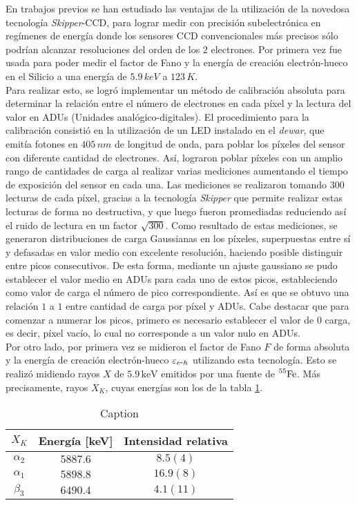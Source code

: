 \noindent En trabajos previos\cite{Rodrigues} se han estudiado las ventajas de la utilización de la novedosa tecnología \textit{Skipper}-CCD, para lograr medir con precisión subelectrónica en regímenes de energía donde los sensores CCD convencionales más precisos sólo podrían alcanzar resoluciones del orden de los $2$ electrones. Por primera vez fue usada para poder medir el factor de Fano y la energía de creación electrón-hueco en el Silicio a una energía de $5.9\,\si{keV}$ a $123\,\si{K}$.\\
\indent Para realizar esto, se logró implementar un método de calibración absoluta para determinar la relación entre el número de electrones en cada píxel y la lectura del valor en ADUs (Unidades analógico-digitales). El procedimiento para la calibración consistió en la utilización de un LED instalado en el \textit{dewar}, que emitía fotones en $405\,\si{nm}$ de longitud de onda, para poblar los píxeles del sensor con diferente cantidad de electrones. Así, lograron poblar píxeles con un amplio rango de cantidades de carga al realizar varias mediciones aumentando el tiempo de exposición del sensor en cada una. Las mediciones se realizaron tomando $300$ lecturas de cada píxel, gracias a la tecnología \textit{Skipper} que permite realizar estas lecturas de forma no destructiva, y que luego fueron promediadas reduciendo así el ruido de lectura en un factor $\sqrt{300}$. Como resultado de estas mediciones, se generaron distribuciones de carga Gaussianas en los píxeles, superpuestas entre sí y defasadas en valor medio con excelente resolución, haciendo posible distinguir entre picos consecutivos. De esta forma, mediante un ajuste gaussiano se pudo establecer el valor medio en ADUs para cada uno de estos picos, estableciendo como valor de carga el número de pico correspondiente. Así es que se obtuvo una relación $1$ a $1$ entre cantidad de carga por píxel y ADUs. Cabe destacar que para comenzar a numerar los picos, primero es necesario establecer el valor de $0$ carga, es decir, píxel vacío, lo cual no corresponde a un valor nulo en ADUs. \\
\indent Por otro lado, por primera vez se midieron el factor de Fano $F$ de forma absoluta y la energía de creación electrón-hueco $\varepsilon_{e\mbox{-}h}$ utilizando esta tecnología. Esto se realizó midiendo rayos $X$ de $5.9\,\si{\mbox{keV}}$ emitidos por una fuente de $\prescript{55}{}{\mbox{Fe}}$. Más precisamente, rayos $X_{K}$, cuyas energías son los de la tabla \ref{tab:EnergiasXk}.
\begin{table}[h]
\centering
\begin{tabular}{@{}ccc@{}}
\toprule
$X_{K}$         &   Energía [keV]   &   Intensidad relativa \\ \hline \hline
$\alpha_{2}$    &   $5887.6$        &   $8.5 (4)$           \\
$\alpha_{1}$    &   $5898.8$        &   $16.9 (8)$          \\
$\beta_{3}$     &   $6490.4$        &   $4.1 (11)$          \\ \bottomrule
\end{tabular}
\caption{\footnotesize{Caption}}
\label{tab:EnergiasXk}
\end{table}
